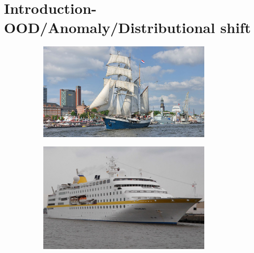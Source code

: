 \section{Introduction-OOD/Anomaly/Distributional shift}
\label{sec:oodvanom}
\begin{figure}[h!]
    \begin{subfigure}{0.333\textwidth}
        \centering
        \includegraphics[height=0.15\textheight,width=0.95\textwidth]{images/intro_ood_anomaly/old_ship.jpg}
        \caption{}
        \label{fig:old_ship}
    \end{subfigure}
    \begin{subfigure}{0.333\textwidth}
        \centering
        \includegraphics[height=0.15\textheight,width=0.95\textwidth]{images/intro_ood_anomaly/Trainer_cruiser.jpeg}
        \caption{}
        \label{fig:trian_cruiser}
    \end{subfigure}
    \begin{subfigure}{0.333\textwidth}
        \centering

\end{subfigure}
\end{figure}
